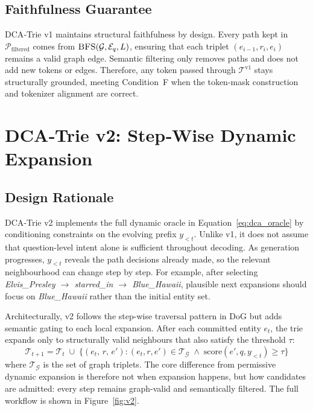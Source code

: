 \subsection{Faithfulness Guarantee}

DCA‑Trie v1 maintains structural faithfulness by design. Every path kept in $\mathcal{P}_{\text{filtered}}$ comes from $\textsc{BFS}(\mathcal{G}, \mathcal{E}_q, L)$, ensuring that each triplet $(e_{i-1}, r_i, e_i)$ remains a valid graph edge. Semantic filtering only removes paths and does not add new tokens or edges. Therefore, any token passed through $\mathcal{T}^{\text{v1}}$ stays structurally grounded, meeting Condition~F when the token-mask construction and tokenizer alignment are correct.

\section{DCA‑Trie v2: Step‑Wise Dynamic Expansion}
\label{sec:ch3v2}

\subsection{Design Rationale}

DCA‑Trie v2 implements the full dynamic oracle in Equation~\eqref{eq:dca_oracle} by conditioning constraints on the evolving prefix $y_{<t}$. Unlike v1, it does not assume that question-level intent alone is sufficient throughout decoding. As generation progresses, $y_{<t}$ reveals the path decisions already made, so the relevant neighbourhood can change step by step. For example, after selecting \textit{Elvis\_Presley $\to$ starred\_in $\to$ Blue\_Hawaii}, plausible next expansions should focus on \textit{Blue\_Hawaii} rather than the initial entity set.

Architecturally, v2 follows the step-wise traversal pattern in DoG \citep{li2024-decoding-on-graphs} but adds semantic gating to each local expansion. After each committed entity $e_t$, the trie expands only to structurally valid neighbours that also satisfy the threshold $\tau$:
\begin{equation}
  \mathcal{T}_{t+1} = \mathcal{T}_t \;\cup\; \bigl\{(e_t,\, r,\, e') :
  (e_t, r, e') \in \mathcal{T}_{\mathcal{G}} \;\wedge\;
  \text{score}(e', q, y_{<t}) \geq \tau\bigr\}
  \label{eq:v2expansion}
\end{equation}
where $\mathcal{T}_{\mathcal{G}}$ is the set of graph triplets. The core difference from permissive dynamic expansion is therefore not when expansion happens, but how candidates are admitted: every step remains graph-valid and semantically filtered. The full workflow is shown in Figure~\ref{fig:v2}.

